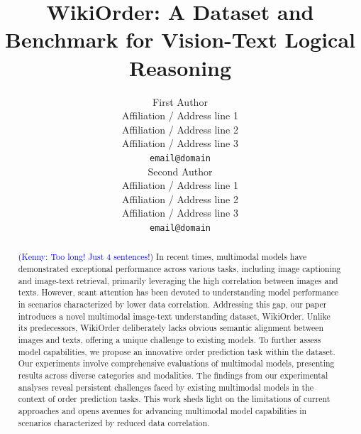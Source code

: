 \documentclass[11pt]{article}
\title{WikiOrder: A Dataset and Benchmark for Vision-Text Logical Reasoning}
\author{First Author \\
  Affiliation / Address line 1 \\
  Affiliation / Address line 2 \\
  Affiliation / Address line 3 \\
  \texttt{email@domain} \\\And
  Second Author \\
  Affiliation / Address line 1 \\
  Affiliation / Address line 2 \\
  Affiliation / Address line 3 \\
  \texttt{email@domain} \\}
\newcommand{\KZ}[1]{\textcolor{blue}{(Kenny: #1})}
\begin{document}
\maketitle
\begin{abstract}

\KZ{Too long! Just 4 sentences!}
In recent times, multimodal models have demonstrated exceptional performance across various tasks, including image captioning and image-text retrieval, primarily leveraging the high correlation between images and texts. However, scant attention has been devoted to understanding model performance in scenarios characterized by lower data correlation. Addressing this gap, our paper introduces a novel multimodal image-text understanding dataset, WikiOrder. Unlike its predecessors, WikiOrder deliberately lacks obvious semantic alignment between images and texts, offering a unique challenge to existing models. To further assess model capabilities, we propose an innovative order prediction task within the dataset.  Our experiments involve comprehensive evaluations of multimodal models, presenting results across diverse categories and modalities. The findings from our experimental analyses reveal persistent challenges faced by existing multimodal models in the context of order prediction tasks. This work sheds light on the limitations of current approaches and opens avenues for advancing multimodal model capabilities in scenarios characterized by reduced data correlation.

\end{abstract}
\end{document}
